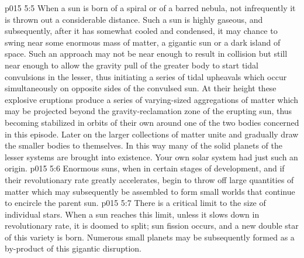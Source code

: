 \vs p015 5:5 \bibnobreakspace {} When a sun is born of a spiral or of a barred nebula, not infrequently it is thrown out a considerable distance. Such a sun is highly gaseous, and subsequently, after it has somewhat cooled and condensed, it may chance to swing near some enormous mass of matter, a gigantic sun or a dark island of space. Such an approach may not be near enough to result in collision but still near enough to allow the gravity pull of the greater body to start tidal convulsions in the lesser, thus initiating a series of tidal upheavals which occur simultaneously on opposite sides of the convulsed sun. At their height these explosive eruptions produce a series of varying\hyp{}sized aggregations of matter which may be projected beyond the gravity\hyp{}reclamation zone of the erupting sun, thus becoming stabilized in orbits of their own around one of the two bodies concerned in this episode. Later on the larger collections of matter unite and gradually draw the smaller bodies to themselves. In this way many of the solid planets of the lesser systems are brought into existence. Your own solar system had just such an origin.
\vs p015 5:6 \bibnobreakspace {} Enormous suns, when in certain stages of development, and if their revolutionary rate greatly accelerates, begin to throw off large quantities of matter which may subsequently be assembled to form small worlds that continue to encircle the parent sun.
\vs p015 5:7 \bibnobreakspace {} There is a critical limit to the size of individual stars. When a sun reaches this limit, unless it slows down in revolutionary rate, it is doomed to split; sun fission occurs, and a new double star of this variety is born. Numerous small planets may be subsequently formed as a by\hyp{}product of this gigantic disruption.
